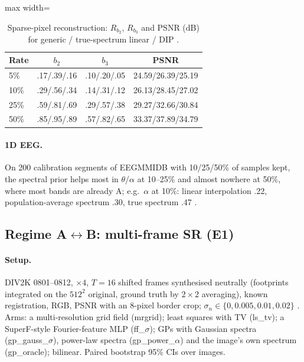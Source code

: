 \begin{table}[t]\centering\small
\caption{Sparse-pixel reconstruction: $R_{b_2}$, $R_{b_3}$ and PSNR (dB) for
generic / true-spectrum linear / DIP .}\label{tab:sparse}
\setlength{\tabcolsep}{3pt}
\begin{adjustbox}{max width=\linewidth}\begin{tabular}{lccc}\toprule
Rate & $b_2$ & $b_3$ & PSNR\\\midrule
5\% & .17/.39/.16 & .10/.20/.05 & 24.59/26.39/25.19\\
10\% & .29/.56/.34 & .14/.31/.12 & 26.13/28.45/27.02\\
25\% & .59/.81/.69 & .29/.57/.38 & 29.27/32.66/30.84\\
50\% & .85/.95/.89 & .57/.82/.65 & 33.37/37.89/34.79\\
\bottomrule\end{tabular}\end{adjustbox}
\end{table}

\paragraph{1D EEG.} On 200 calibration segments of EEGMMIDB
\citep{goldberger2000physionet,schalk2004bci2000} with 10/25/50\% of samples
kept, the spectral prior helps most in $\theta$/$\alpha$ at 10--25\% and
almost nowhere at 50\%, where most bands are already A; e.g.\ $\alpha$ at
10\%: linear interpolation .22, population-average spectrum .30, true
spectrum .47 . 

\subsection{Regime A$\leftrightarrow$B: multi-frame SR (E1)}\label{sec:exp-ab}

\paragraph{Setup.} DIV2K 0801--0812, $\times4$, $T=16$ shifted frames
synthesised neutrally (footprints integrated on the $512^2$ original, ground
truth by $2\times2$ averaging), known registration, RGB, PSNR with an 8-pixel
border crop; $\sigma_n\in\{0,0.005,0.01,0.02\}$ . Arms: a
multi-resolution grid field (mrgrid); least squares with TV (ls\_tv); a
SuperF-style Fourier-feature MLP (ff\_$\sigma$); GPs with Gaussian spectra
(gp\_gauss\_$\sigma$), power-law spectra (gp\_power\_$\alpha$) and the
image's own spectrum (gp\_oracle); bilinear. Paired bootstrap 95\% CIs over
images.

